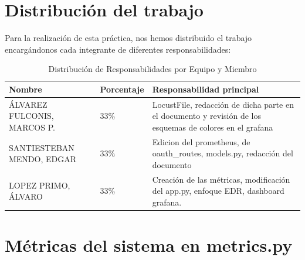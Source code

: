 \documentclass[12pt, a4paper]{article}
\begin{document}
	\section{Distribución del trabajo}
		Para la realización de esta práctica, nos hemos distribuido el trabajo encargándonos cada integrante de diferentes responsabilidades:
		\begin{table}[h!] %
			\centering    %
			\begin{tabularx}{\textwidth}{llX} 
				\toprule
				\textbf{Nombre} & \textbf{Porcentaje} & \textbf{Responsabilidad principal} \\
				\midrule
				ÁLVAREZ FULCONIS, MARCOS P. & 33\% & LocustFile, redacción de dicha parte en el documento y revisión de los esquemas de colores en el grafana \\
				\midrule
				SANTIESTEBAN MENDO, EDGAR   & 33\% & Edicion del prometheus, de oauth\_routes, models.py, redacción del documento \\
				\midrule
				LOPEZ PRIMO, ÁLVARO         & 33\% & Creación de las métricas, modificación del app.py, enfoque EDR, dashboard grafana. \\
				\bottomrule
			\end{tabularx}
			\caption{Distribución de Responsabilidades por Equipo y Miembro}
		\end{table} %

\clearpage %



\appendix  %
\section{Métricas del sistema en metrics.py} \label{anexo:metrics.py}
\vspace{1cm}

\vspace{1cm}
\end{document}
